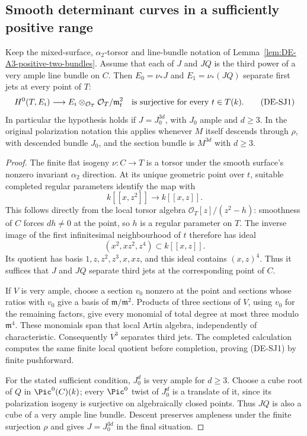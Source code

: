 \subsection{Smooth determinant curves in a sufficiently positive range}

\begin{lemma}
\label{lem:DE-A3-positive-pushforward-jets}
Keep the mixed-surface, $\alpha_2$-torsor and line-bundle notation
of Lemma~\ref{lem:DE-A3-positive-two-bundles}. Assume that each of
$J$ and $JQ$ is the third power of a very ample line bundle on $C$.
Then $E_0=\nu_*J$ and $E_1=\nu_*(JQ)$ separate first jets at every
point of $T$:
\[
 H^0(T,E_i)\longrightarrow
 E_i\otimes_{\mathcal O_T}\mathcal O_T/\mathfrak m_t^2
 \quad\hbox{is surjective for every }t\in T(k).
                                                        \tag{DE-SJ1}
\]
In particular the hypothesis holds if $J=J_0^{3d}$, with $J_0$
ample and $d\ge3$. In the original polarization notation this
applies whenever $M$ itself descends through $\rho$, with descended
bundle $J_0$, and the section bundle is $M^{3d}$ with $d\ge3$.
\end{lemma}
\begin{proof}
The finite flat isogeny $\nu:C\to T$ is a torsor under the smooth
surface's nonzero invariant $\alpha_2$ direction. At its unique
geometric point over $t$, suitable completed regular parameters
identify the map with
\[
                  k[[x,z^2]]\longrightarrow k[[x,z]].
\]
This follows directly from the local torsor algebra
$\mathcal O_T[z]/(z^2-h)$: smoothness of $C$ forces $dh\ne0$
at the point, so $h$ is a regular parameter on $T$.
The inverse image of the first infinitesimal neighbourhood of $t$
therefore has ideal
\[
                   (x^2,xz^2,z^4)\subset k[[x,z]].
\]
Its quotient has basis $1,z,z^2,z^3,x,xz$, and this ideal contains
$(x,z)^4$. Thus it suffices that $J$ and $JQ$ separate third jets
at the corresponding point of $C$.

If $V$ is very ample, choose a section $v_0$ nonzero at the point
and sections whose ratios with $v_0$ give a basis of
$\mathfrak m/\mathfrak m^2$. Products of three sections of $V$,
using $v_0$ for the remaining factors, give every monomial of total
degree at most three modulo $\mathfrak m^4$. These monomials span
that local Artin algebra, independently of characteristic.
Consequently $V^3$ separates third jets. The completed calculation
computes the same finite local quotient before completion, proving
(DE-SJ1) by finite pushforward.

For the stated sufficient condition, $J_0^d$ is very ample for
$d\ge3$. Choose a cube root of $Q$ in $\Pic^0(C)(k)$; every
$\Pic^0$ twist of $J_0^d$ is a translate of it, since its
polarization isogeny is surjective on algebraically closed points.
Thus $JQ$ is also a cube of a very ample line bundle. Descent
preserves ampleness under the finite surjection $\rho$ and gives
$J=J_0^{3d}$ in the final situation.
\end{proof}

